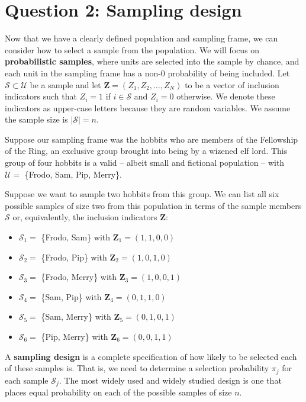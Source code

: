 \documentclass[
  13pt,
  letterpaper,
  DIV=11,
  numbers=noendperiod]{scrreprt}
\providecommand{\tightlist}{%
  \setlength{\itemsep}{0pt}\setlength{\parskip}{0pt}}
\newcommand{\mb}{\bm}
\theoremstyle{plain}
\theoremstyle{plain}
\theoremstyle{definition}
\theoremstyle{definition}
\theoremstyle{remark}
\begin{document}
\section{Question 2: Sampling design}\label{question-2-sampling-design}

Now that we have a clearly defined population and sampling frame, we can
consider how to select a sample from the population. We will focus on
\textbf{probabilistic samples}, where units are selected into the sample
by chance, and each unit in the sampling frame has a non-0 probability
of being included. Let \(\mathcal{S} \subset \mathcal{U}\) be a sample
and let \(\mb{Z} = (Z_1, Z_2, \ldots, Z_N)\) to be a vector of inclusion
indicators such that \(Z_i = 1\) if \(i \in \mathcal{S}\) and
\(Z_i = 0\) otherwise. We denote these indicators as upper-case letters
because they are random variables. We assume the sample size is
\(|\mathcal{S}| = n\).

Suppose our sampling frame was the hobbits who are members of the
Fellowship of the Ring, an exclusive group brought into being by a
wizened elf lord. This group of four hobbits is a valid -- albeit small
and fictional population -- with \(\mathcal{U} =\) \{Frodo, Sam, Pip,
Merry\}.

Suppose we want to sample two hobbits from this group. We can list all
six possible samples of size two from this population in terms of the
sample members \(\mathcal{S}\) or, equivalently, the inclusion
indicators \(\mb{Z}\):

\begin{itemize}
\tightlist
\item
  \(\mathcal{S}_1 =\) \{Frodo, Sam\} with \(\mb{Z}_{1} = (1, 1, 0, 0)\)
\item
  \(\mathcal{S}_2 =\) \{Frodo, Pip\} with \(\mb{Z}_{2} = (1, 0, 1, 0)\)
\item
  \(\mathcal{S}_3 =\) \{Frodo, Merry\} with
  \(\mb{Z}_{3} = (1, 0, 0, 1)\)
\item
  \(\mathcal{S}_4 =\) \{Sam, Pip\} with \(\mb{Z}_{4} = (0, 1, 1, 0)\)
\item
  \(\mathcal{S}_5 =\) \{Sam, Merry\} with \(\mb{Z}_{5} = (0, 1, 0, 1)\)
\item
  \(\mathcal{S}_6 =\) \{Pip, Merry\} with \(\mb{Z}_{6} = (0, 0, 1, 1)\)
\end{itemize}

A \textbf{sampling design} is a complete specification of how likely to
be selected each of these samples is. That is, we need to determine a
selection probability \(\pi_j\) for each sample \(\mathcal{S}_j\). The
most widely used and widely studied design is one that places equal
probability on each of the possible samples of size \(n\).
\end{document}
